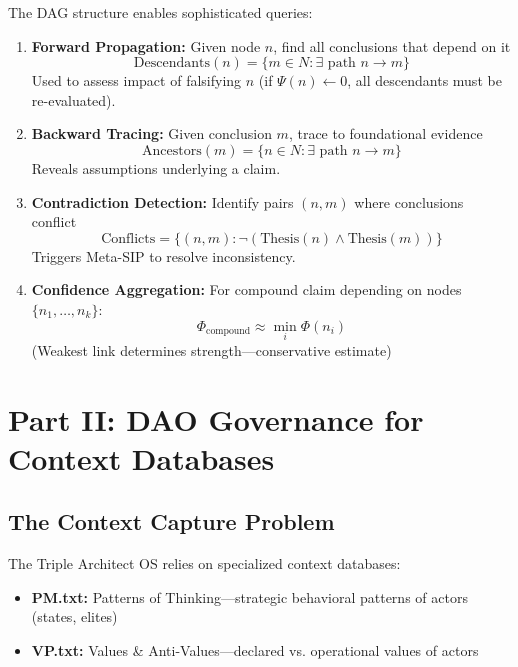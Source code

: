\documentclass[11pt,a4paper]{article}
\theoremstyle{definition}
\theoremstyle{remark}
\newcommand{\SIP}{\textsc{SIP}}
\begin{document}
The DAG structure enables sophisticated queries:

\begin{enumerate}
    \item \textbf{Forward Propagation:} Given node $n$, find all conclusions that depend on it
    \[
    \text{Descendants}(n) = \{m \in N : \exists \text{ path } n \to m\}
    \]
    Used to assess impact of falsifying $n$ (if $\Psi(n) \gets 0$, all descendants must be re-evaluated).
    
    \item \textbf{Backward Tracing:} Given conclusion $m$, trace to foundational evidence
    \[
    \text{Ancestors}(m) = \{n \in N : \exists \text{ path } n \to m\}
    \]
    Reveals assumptions underlying a claim.
    
    \item \textbf{Contradiction Detection:} Identify pairs $(n, m)$ where conclusions conflict
    \[
    \text{Conflicts} = \{(n,m) : \neg(\text{Thesis}(n) \land \text{Thesis}(m))\}
    \]
    Triggers Meta-\SIP{} to resolve inconsistency.
    
    \item \textbf{Confidence Aggregation:} For compound claim depending on nodes $\{n_1, \ldots, n_k\}$:
    \[
    \Phi_{\text{compound}} \approx \min_{i} \Phi(n_i)
    \]
    (Weakest link determines strength—conservative estimate)
\end{enumerate}

\section{Part II: DAO Governance for Context Databases}

\subsection{The Context Capture Problem}

The Triple Architect OS relies on specialized context databases:
\begin{itemize}
    \item \textbf{PM.txt:} Patterns of Thinking—strategic behavioral patterns of actors (states, elites)
    \item \textbf{VP.txt:} Values \& Anti-Values—declared vs. operational values of actors
\end{itemize}
\end{document}

